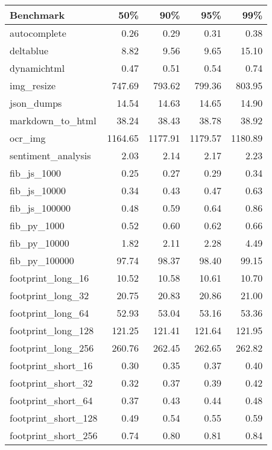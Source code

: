 \begin{tabular}{lrrrr}
  \toprule
Benchmark & 50\% & 90\% & 95\% & 99\% \\ 
  \midrule
autocomplete & 0.26 & 0.29 & 0.31 & 0.38 \\ 
  deltablue & 8.82 & 9.56 & 9.65 & 15.10 \\ 
  dynamichtml & 0.47 & 0.51 & 0.54 & 0.74 \\ 
  img\_resize & 747.69 & 793.62 & 799.36 & 803.95 \\ 
  json\_dumps & 14.54 & 14.63 & 14.65 & 14.90 \\ 
  markdown\_to\_html & 38.24 & 38.43 & 38.78 & 38.92 \\ 
  ocr\_img & 1164.65 & 1177.91 & 1179.57 & 1180.89 \\ 
  sentiment\_analysis & 2.03 & 2.14 & 2.17 & 2.23 \\ 
  fib\_js\_1000 & 0.25 & 0.27 & 0.29 & 0.34 \\ 
  fib\_js\_10000 & 0.34 & 0.43 & 0.47 & 0.63 \\ 
  fib\_js\_100000 & 0.48 & 0.59 & 0.64 & 0.86 \\ 
  fib\_py\_1000 & 0.52 & 0.60 & 0.62 & 0.66 \\ 
  fib\_py\_10000 & 1.82 & 2.11 & 2.28 & 4.49 \\ 
  fib\_py\_100000 & 97.74 & 98.37 & 98.40 & 99.15 \\ 
  footprint\_long\_16 & 10.52 & 10.58 & 10.61 & 10.70 \\ 
  footprint\_long\_32 & 20.75 & 20.83 & 20.86 & 21.00 \\ 
  footprint\_long\_64 & 52.93 & 53.04 & 53.16 & 53.36 \\ 
  footprint\_long\_128 & 121.25 & 121.41 & 121.64 & 121.95 \\ 
  footprint\_long\_256 & 260.76 & 262.45 & 262.65 & 262.82 \\ 
  footprint\_short\_16 & 0.30 & 0.35 & 0.37 & 0.40 \\ 
  footprint\_short\_32 & 0.32 & 0.37 & 0.39 & 0.42 \\ 
  footprint\_short\_64 & 0.37 & 0.43 & 0.44 & 0.48 \\ 
  footprint\_short\_128 & 0.49 & 0.54 & 0.55 & 0.59 \\ 
  footprint\_short\_256 & 0.74 & 0.80 & 0.81 & 0.84 \\ 
   \bottomrule
\end{tabular}
